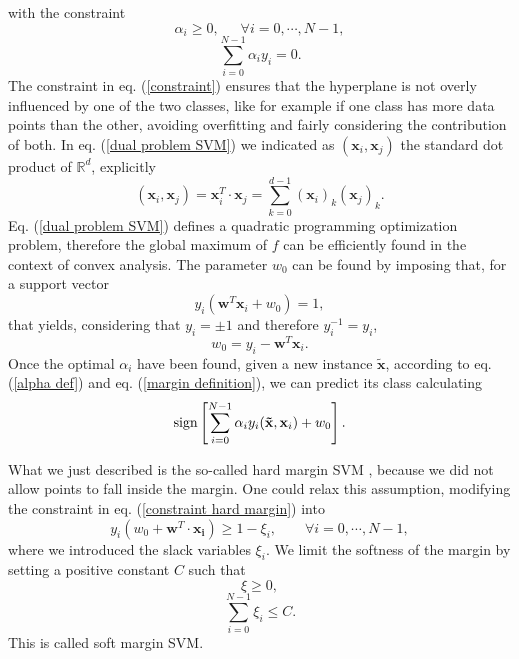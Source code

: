 \documentclass[12pt]{article}
\begin{document}
with the constraint
\begin{equation}
    \alpha_i\geq 0,\,\,\,\,\,\,\,\,\,\forall i=0,\cdots, N-1,
\end{equation}
\begin{equation}
    \sum_{i=0}^{N-1}\alpha_iy_i=0.
    \label{constraint}
\end{equation}
The constraint in eq. (\ref{constraint}) ensures that the hyperplane is not overly influenced by one of the two classes, like for example if one class has more data points than the other, avoiding overfitting and fairly considering the contribution of both.  
In eq. (\ref{dual problem SVM}) we indicated as $(\mathbf{x}_i,\mathbf{x}_j)$ the standard dot product of $\mathbb{R}^d$, explicitly
$$(\mathbf{x}_i,\mathbf{x}_j)=\mathbf{x}_i^T\cdot\mathbf{x}_j=\sum_{k=0}^{d-1}(\mathbf{x}_i)_k(\mathbf{x}_j)_k.$$
Eq. (\ref{dual problem SVM}) defines a quadratic programming
optimization problem, therefore the global maximum of $f$ can be efficiently found in the context of convex analysis. The parameter $w_0$ can be found by imposing that, for a support vector $$y_i(\mathbf{w}^T\mathbf{x}_i+w_0)=1,$$ that yields, considering that $y_i=\pm 1$ and therefore $y_i^{-1}=y_i$,
\begin{equation}
    w_0=y_i-\mathbf{w}^T\mathbf{x}_i.
\end{equation} 
Once the optimal $\alpha_i$ have been found, given a new instance $\mathbf{\tilde{x}}$, according to eq. (\ref{alpha def}) and eq. (\ref{margin definition}), we can predict its class calculating 
\begin{equation}
    \textup{sign}\left[\sum_{i=0}^{N-1}\alpha_iy_i(\mathbf{\tilde{x}}, \mathbf{x}_i)+w_0\right].
    \label{decision boundary svm}
\end{equation} 

What we just described is the so-called hard margin SVM \cite{cristianini2000}, because we did not allow points to fall inside the margin. One could relax this assumption, modifying the constraint in eq. (\ref{constraint hard margin}) into 
\begin{equation}
    y_i(w_0+\mathbf{w}^T\cdot \mathbf{x_i})\geq 1-\xi_i, \,\,\,\,\,\,\,\,\,\,\,\, \forall i=0,\cdots, N-1,
\end{equation}
where we introduced the slack variables $\xi_i$. We limit the softness of the margin by setting a positive constant $C$ such that 
$$ \xi\geq0,$$
\begin{equation}
    \sum_{i=0}^{N-1}\xi_i\leq C.
\end{equation}
This is called soft margin SVM. 
\end{document}
